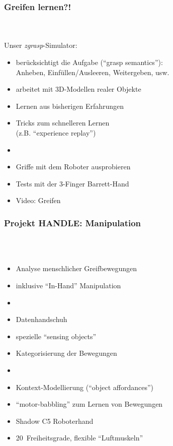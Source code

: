 \documentclass[t]{beamer}
\def\quelle#1{{\tiny \makebox(0,0){}\vfill\hfill #1}}
\begin{document}
\begin{frame}
\frametitle{Greifen lernen?!}
\\
\\
\vspace*{-9mm}
Unser {\em zgrasp}-Simulator:
\begin{itemize}
\item berücksichtigt die Aufgabe ("`grasp semantics"'):\\
      Anheben, Einfüllen/Ausleeren, Weitergeben, usw.
\item arbeitet mit 3D-Modellen realer Objekte
\item Lernen aus bisherigen Erfahrungen 
\item Tricks zum schnelleren Lernen \\
      (z.B. "`experience replay"')
\item[]
\item Griffe mit dem Roboter ausprobieren
\item Tests mit der 3-Finger Barrett-Hand
\item Video: Greifen
\end{itemize}
\end{frame}


\begin{frame}
\frametitle{Projekt HANDLE: Manipulation}
\\
\\
\vspace*{-8mm}%
\begin{itemize}
\item Analyse menschlicher Greifbewegungen
\item inklusive "`In-Hand"' Manipulation
\item[]
\item Datenhandschuh
\item spezielle "`sensing objects"'
\item Kategorisierung der Bewegungen
\item[]
\item Kontext-Modellierung ("`object affordances"')
\item "`motor-babbling"' zum Lernen von Bewegungen
\item Shadow C5 Roboterhand 
\item 20~Freiheitsgrade, flexible "`Luftmuskeln"'
\end{itemize}
\end{frame}
\end{document}
